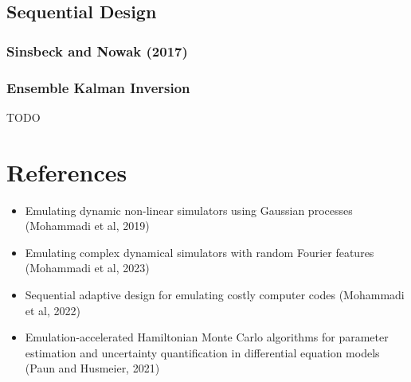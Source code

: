 \documentclass[12pt]{article}
\begin{document}
\subsection{Sequential Design}

\subsubsection{Sinsbeck and Nowak (2017)}


\subsubsection{Ensemble Kalman Inversion}
TODO

\section{References}
\begin{itemize}
\item Emulating dynamic non-linear simulators using Gaussian processes (Mohammadi et al, 2019)
\item Emulating complex dynamical simulators with random Fourier features (Mohammadi et al, 2023)
\item Sequential adaptive design for emulating costly computer codes (Mohammadi et al, 2022)
\item Emulation-accelerated Hamiltonian Monte Carlo algorithms for parameter estimation and uncertainty quantification in differential equation models (Paun and Husmeier, 2021)
\end{itemize}
\end{document}
